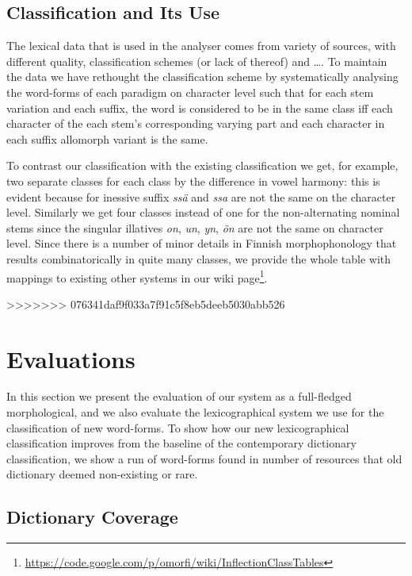 \documentclass[a4paper,12pt]{article}
\begin{document}
\subsection{Classification and Its Use}

The lexical data that is used in the analyser comes from variety of sources,
with different quality, classification schemes (or lack of thereof) and \ldots.
To maintain the data we have rethought the classification scheme by
systematically analysing the word-forms of each paradigm on character level such
that for each stem variation and each suffix, the word is considered to be in
the same class iff each character of the each stem's corresponding varying part
and each character in each suffix allomorph variant is the same. 

To contrast our classification with the existing classification we get, for
example, two separate classes for each class by the difference in vowel
harmony: this is evident because for inessive suffix \emph{ssä} and \emph{ssa}
are not the same on the character level. Similarly we get four classes instead
of one for the non-alternating nominal stems since the singular illatives
\emph{on}, \emph{un}, \emph{yn}, \emph{ön} are not the same on character level.
Since there is a number of minor details in Finnish morphophonology that
results combinatorically in quite many classes, we provide the whole table with
mappings to existing other systems in our wiki
page\footnote{\url{https://code.google.com/p/omorfi/wiki/InflectionClassTables}}.


>>>>>>> 076341daf9f033a7f91c5f8eb5deeb5030abb526

\section{Evaluations}

In this section we present the evaluation of our system as a full-fledged
morphological, and we also evaluate the lexicographical system we use for
the classification of new word-forms. To show how our new lexicographical
classification improves from the baseline of the contemporary dictionary
classification, we show a run of word-forms found in number of resources that
old dictionary deemed non-existing or rare.

\subsection{Dictionary Coverage}
\end{document}
